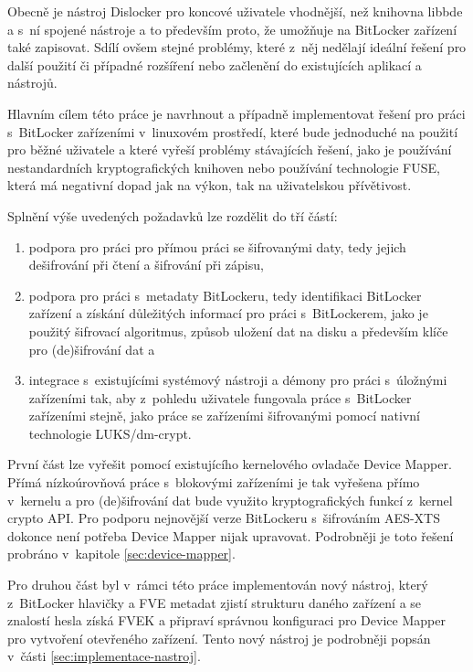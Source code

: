 Obecně je nástroj Dislocker pro koncové uživatele vhodnější, než knihovna libbde a s~ní spojené nástroje a to především proto, že umožňuje na BitLocker zařízení také zapisovat. Sdílí ovšem stejné problémy, které z~něj nedělají ideální řešení pro další použití či případné rozšíření nebo začlenění do existujících aplikací a nástrojů.




Hlavním cílem této práce je navrhnout a případně implementovat řešení pro práci s~BitLocker zařízeními v~linuxovém prostředí, které bude jednoduché na použití pro běžné uživatele a které vyřeší problémy stávajících řešení, jako je používání nestandardních kryptografických knihoven nebo používání technologie FUSE, která má negativní dopad jak na výkon, tak na uživatelskou přívětivost.

Splnění výše uvedených požadavků lze rozdělit do tří částí:

\begin{enumerate}
	\item podpora pro práci pro přímou práci se šifrovanými daty, tedy jejich dešifrování při čtení a šifrování při zápisu,
	\item podpora pro práci s~metadaty BitLockeru, tedy identifikaci BitLocker zařízení a získání důležitých informací pro práci s~BitLockerem, jako je použitý šifrovací algoritmus, způsob uložení dat na disku a především klíče pro (de)šifrování dat a
	\item integrace s~existujícími systémový nástroji a démony pro práci s~úložnými zařízeními tak, aby z~pohledu uživatele fungovala práce s~BitLocker zařízeními stejně, jako práce se zařízeními šifrovanými pomocí nativní technologie LUKS/dm-crypt.
\end{enumerate}

První část lze vyřešit pomocí existujícího kernelového ovladače Device Mapper. Přímá nízkoúrovňová práce s~blokovými zařízeními je tak vyřešena přímo v~kernelu a pro (de)šifrování dat bude využito kryptografických funkcí z~kernel crypto API. Pro podporu nejnovější verze BitLockeru s~šifrováním AES-XTS dokonce není potřeba Device Mapper nijak upravovat. Podrobněji je toto řešení probráno v~kapitole \ref{sec:device-mapper}.

Pro druhou část byl v~rámci této práce implementován nový nástroj, který z~BitLocker hlavičky a FVE metadat zjistí strukturu daného zařízení a se znalostí hesla získá FVEK a připraví správnou konfiguraci pro Device Mapper pro vytvoření otevřeného zařízení. Tento nový nástroj je podrobněji popsán v~části \ref{sec:implementace-nastroj}.

